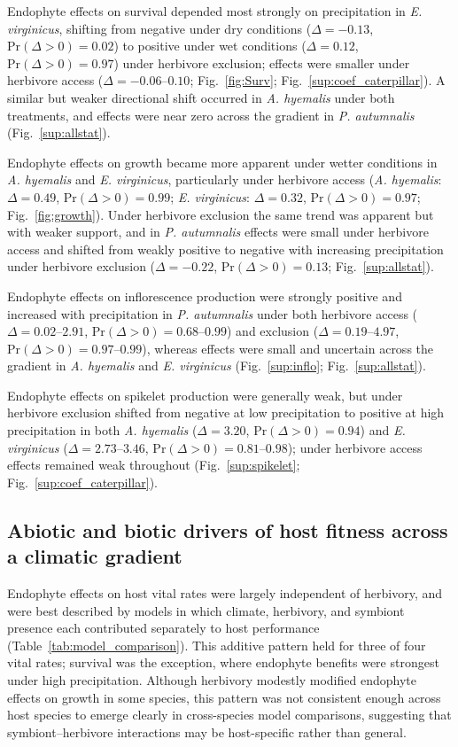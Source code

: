 \documentclass[12pt]{article}\usepackage[]{graphicx}\usepackage[dvipsnames]{xcolor}
\begin{document}
Endophyte effects on survival depended most strongly on precipitation in \textit{E. virginicus}, shifting from negative under dry conditions ($\Delta = -0.13$, $\mathrm{Pr}(\Delta > 0) = 0.02$) to positive under wet conditions ($\Delta = 0.12$, $\mathrm{Pr}(\Delta > 0) = 0.97$) under herbivore exclusion; effects were smaller under herbivore access ($\Delta = -0.06$--$0.10$; Fig.~\ref{fig:Surv}; Fig.~\ref{sup:coef_caterpillar}). 
A similar but weaker directional shift occurred in \textit{A. hyemalis} under both treatments, and effects were near zero across the gradient in \textit{P. autumnalis} (Fig.~\ref{sup:allstat}).

Endophyte effects on growth became more apparent under wetter conditions in \textit{A. hyemalis} and \textit{E. virginicus}, particularly under herbivore access (\textit{A. hyemalis}: $\Delta = 0.49$, $\mathrm{Pr}(\Delta > 0) = 0.99$; \textit{E. virginicus}: $\Delta = 0.32$, $\mathrm{Pr}(\Delta > 0) = 0.97$; Fig.~\ref{fig:growth}). 
Under herbivore exclusion the same trend was apparent but with weaker support, and in \textit{P. autumnalis} effects were small under herbivore access and shifted from weakly positive to negative with increasing precipitation under herbivore exclusion ($\Delta = -0.22$, $\mathrm{Pr}(\Delta > 0) = 0.13$; Fig.~\ref{sup:allstat}).

Endophyte effects on inflorescence production were strongly positive and increased with precipitation in \textit{P. autumnalis} under both herbivore access ($\Delta = 0.02$--$2.91$, $\mathrm{Pr}(\Delta > 0) = 0.68$--$0.99$) and exclusion ($\Delta = 0.19$--$4.97$, $\mathrm{Pr}(\Delta > 0) = 0.97$--$0.99$), whereas effects were small and uncertain across the gradient in \textit{A. hyemalis} and \textit{E. virginicus} (Fig.~\ref{sup:inflo}; Fig.~\ref{sup:allstat}).

Endophyte effects on spikelet production were generally weak, but under herbivore exclusion shifted from negative at low precipitation to positive at high precipitation in both \textit{A. hyemalis} ($\Delta = 3.20$, $\mathrm{Pr}(\Delta > 0) = 0.94$) and \textit{E. virginicus} ($\Delta = 2.73$--$3.46$, $\mathrm{Pr}(\Delta > 0) = 0.81$--$0.98$); under herbivore access effects remained weak throughout (Fig.~\ref{sup:spikelet}; Fig.~\ref{sup:coef_caterpillar}).

\subsection*{Abiotic and biotic drivers of host fitness across a climatic gradient}
Endophyte effects on host vital rates were largely independent of herbivory, and were best described by models in which climate, herbivory, and symbiont presence each contributed separately to host performance (Table~\ref{tab:model_comparison}). 
This additive pattern held for three of four vital rates; survival was the exception, where endophyte benefits were strongest under high precipitation.
Although herbivory modestly modified endophyte effects on growth in some species, this pattern was not consistent enough across host species to emerge clearly in cross-species model comparisons, suggesting that symbiont--herbivore interactions may be host-specific rather than general.
\end{document}
